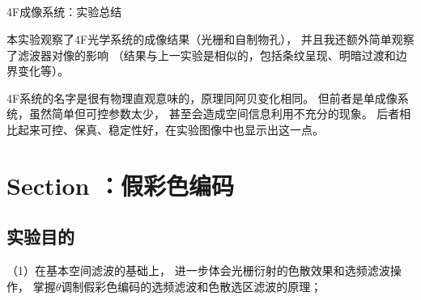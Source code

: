 \documentclass[11pt]{article}
\begin{document}
\subsection[4F成像系统：实验总结 ]{}

\begin{center}
    \begin{tcolorbox}[colback=gray!10,%
                      colframe=black,%
                      width=5cm,%
                      arc=1mm, auto outer arc,
                      boxrule=0.5pt,
                     ]
                     \begin{center}
                    4F成像系统：实验总结      
                     \end{center}
    \end{tcolorbox}
\end{center}

本实验观察了4F光学系统的成像结果（光栅和自制物孔），
并且我还额外简单观察了滤波器对像的影响
（结果与上一实验是相似的，包括条纹呈现、明暗过渡和边界变化等）。

4F系统的名字是很有物理直观意味的，原理同阿贝变化相同。
但前者是单成像系统，虽然简单但可控参数太少，
甚至会造成空间信息利用不充分的现象。
后者相比起来可控、保真、稳定性好，在实验图像中也显示出这一点。





























\newpage

\section[假彩色编码]{Section ：假彩色编码}

\subsection{实验目的}

（1）在基本空间滤波的基础上，
进一步体会光栅衍射的色散效果和选频滤波操作，
掌握$\theta$调制假彩色编码的选频滤波和色散选区滤波的原理；
\end{document}
